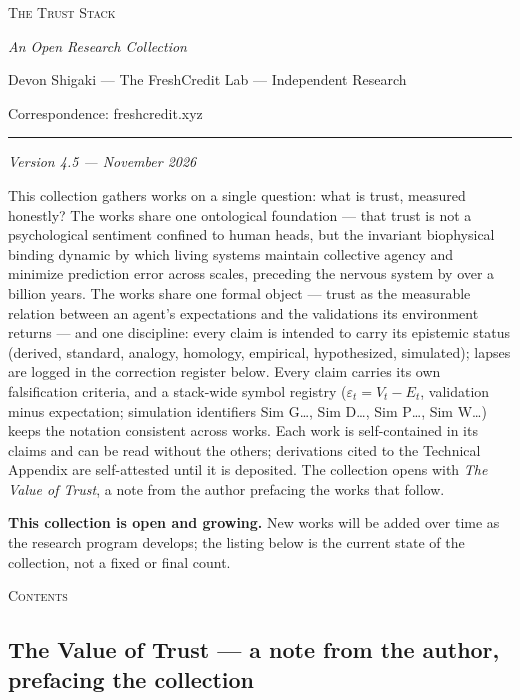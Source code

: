 \documentclass[11pt]{article}
\renewcommand{\maketitle}{%
  \begin{center}
    {\LARGE\scshape The Trust Stack\par}
    \vspace{0.7em}
    {\large\itshape An Open Research Collection\par}
    \vspace{1.0em}
    {\normalsize Devon Shigaki --- The FreshCredit Lab --- Independent Research\par}
    \vspace{0.2em}
    {\normalsize Correspondence: freshcredit.xyz\par}
    \vspace{0.8em}
    {\rule{0.32\textwidth}{0.4pt}\par}
  \end{center}
  \vspace{1.0em}
}
\begin{document}
\maketitle
\begin{center}\small\itshape Version 4.5 --- November 2026\end{center}
\thispagestyle{empty}

\noindent This collection gathers works on a single question: what is trust,
measured honestly? The works share one ontological foundation --- that trust
is not a psychological sentiment confined to human heads, but the invariant
biophysical binding dynamic by which living systems maintain collective agency
and minimize prediction error across scales, preceding the nervous system by over
a billion years. The works share one formal object --- trust as the measurable
relation between an agent's expectations and the validations its environment
returns --- and one discipline: every claim is intended to carry its epistemic
status (derived, standard, analogy, homology, empirical, hypothesized,
simulated); lapses are logged in the correction register below. Every claim
carries its own falsification criteria, and a stack-wide symbol
registry ($\varepsilon_t = V_t - E_t$, validation minus expectation; simulation
identifiers Sim G\ldots, Sim D\ldots, Sim P\ldots, Sim W\ldots) keeps the
notation consistent across works. Each work is self-contained in its claims and can be read without the others; derivations cited to the Technical Appendix are self-attested until it is deposited. The collection opens with \emph{The Value of Trust}, a note from the
author prefacing the works that follow.

\noindent\textbf{This collection is open and growing.} New works will be added
over time as the research program develops; the listing below is the current
state of the collection, not a fixed or final count.

\vspace{0.6em}
\begin{center}{\large\scshape Contents}\end{center}
\vspace{0.2em}

\subsection*{\texorpdfstring{The Value of Trust --- a note from the author, prefacing the collection}{The Value of Trust -- a note from the author, prefacing the collection}}
\end{document}
